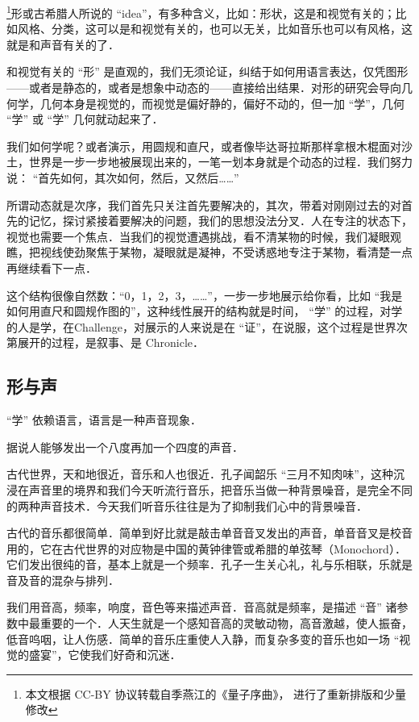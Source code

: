 
\footnote{本文根据 CC-BY 协议转载自季燕江的《量子序曲》， 进行了重新排版和少量修改}形或古希腊人所说的 “idea”，有多种含义，比如：形状，这是和视觉有关的；比如风格、分类，这可以是和视觉有关的，也可以无关，比如音乐也可以有风格，这就是和声音有关的了．

和视觉有关的 “形” 是直观的，我们无须论证，纠结于如何用语言表达，仅凭图形——或者是静态的，或者是想象中动态的——直接给出结果．对形的研究会导向几何学，几何本身是视觉的，而视觉是偏好静的，偏好不动的，但一加 “学”，几何 “学” 或 “学” 几何就动起来了．

我们如何学呢？或者演示，用圆规和直尺，或者像毕达哥拉斯那样拿根木棍面对沙土，世界是一步一步地被展现出来的，一笔一划本身就是个动态的过程．我们努力说： “首先如何，其次如何，然后，又然后……”

所谓动态就是次序，我们首先只关注首先要解决的，其次，带着对刚刚过去的对首先的记忆，探讨紧接着要解决的问题，我们的思想没法分叉．人在专注的状态下，视觉也需要一个焦点．当我们的视觉遭遇挑战，看不清某物的时候，我们凝眼观瞧，把视线使劲聚焦于某物，凝眼就是凝神，不受诱惑地专注于某物，看清楚一点再继续看下一点．

这个结构很像自然数：“0，1，2，3，……”，一步一步地展示给你看，比如 “我是如何用直尺和圆规作图的”，这种线性展开的结构就是时间， “学” 的过程，对学的人是学，在Challenge，对展示的人来说是在 “证”，在说服，这个过程是世界次第展开的过程，是叙事、是 Chronicle．

\subsection{形与声}

“学” 依赖语言，语言是一种声音现象．

据说人能够发出一个八度再加一个四度的声音．

古代世界，天和地很近，音乐和人也很近．孔子闻韶乐 “三月不知肉味”，这种沉浸在声音里的境界和我们今天听流行音乐，把音乐当做一种背景噪音，是完全不同的两种声音技术．今天我们听音乐往往是为了抑制我们心中的背景噪音．

古代的音乐都很简单．简单到好比就是敲击单音音叉发出的声音，单音音叉是校音用的，它在古代世界的对应物是中国的黄钟律管或希腊的单弦琴（Monochord）．它们发出很纯的音，基本上就是一个频率．孔子一生关心礼，礼与乐相联，乐就是音及音的混杂与排列．

我们用音高，频率，响度，音色等来描述声音．音高就是频率，是描述 “音” 诸参数中最重要的一个．人天生就是一个感知音高的灵敏动物，高音激越，使人振奋，低音呜咽，让人伤感．简单的音乐庄重使人入静，而复杂多变的音乐也如一场 “视觉的盛宴”，它使我们好奇和沉迷．

